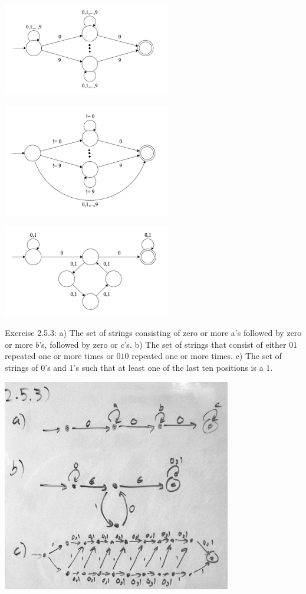 \documentclass{article}
\theoremstyle{theorem}
\theoremstyle{definition}
\theoremstyle{remark}
\begin{document}
\includegraphics[width=0.55\textwidth]{Images/2.3.4a.png}

\includegraphics[width=0.55\textwidth]{Images/2.3.4b.png}

\includegraphics[width=0.55\textwidth]{Images/2.3.4c.png}

\medskip\noindent
Exercise 2.5.3: a) The set of strings consisting of zero or more a's followed by zero or more $b$'s, followed by zero or $c$'s. b) The set of strings that consist of either $01$ repeated one or more times or $010$ repeated one or more times. c) The set of strings of $0$'s and $1$'s such that at least one of the last ten positions is a $1$.

\includegraphics[width=0.75\textwidth]{Images/2.5.3.png}
\end{document}
